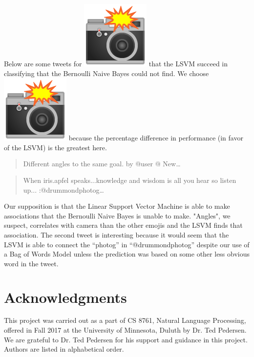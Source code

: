 \documentclass[11pt,a4paper]{article}
\newcommand{\cameraflash}{%
  \begingroup\normalfont
  \includegraphics[height=\fontcharht\font`\B]{emojis/emoji_u1f4f8.png}%
  \endgroup
  \space
}
\begin{document}
Below are some tweets for \cameraflash that the LSVM succeed in classifying that the Bernoulli Naive Bayes could not find. We choose \cameraflash because the percentage difference in performance (in favor of the LSVM) is the greatest here.

\begin{quote}
Different angles to the same goal. by @user @ New…
\end{quote}

\begin{quote}
When iris.apfel speaks...knowledge and wisdom is all you hear so listen up... :@drummondphotog…
\end{quote}

Our supposition is that the Linear Support Vector Machine is able to make associations that the Bernoulli Naive Bayes is unable to make. "Angles", we suspect, correlates with camera than the other emojis and the LSVM finds that association. The second tweet is interesting because it would seem that the LSVM is able to connect the ``photog'' in ``@drummondphotog'' despite our use of a Bag of Words Model unless the prediction was based on some other less obvious word in the tweet.


\section*{Acknowledgments}

This project was carried out as a part of CS 8761, Natural Language Processing, offered in Fall 2017 at the University of Minnesota, Duluth by Dr. Ted Pedersen. We are grateful to Dr. Ted Pedersen for his support and guidance in this project. Authors are listed in alphabetical order.



\end{document}
